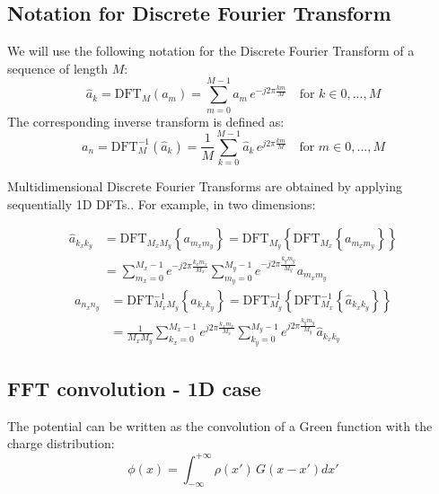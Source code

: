 \subsection{Notation for Discrete Fourier Transform}
We will use the following notation for the Discrete Fourier Transform of a sequence of length $M$:
\begin{equation}
\hat{a}_k = \text{DFT}_M(a_m) =  \sum_{m=0}^{M-1} a_m\, e^{-j2\pi  \frac{km}{M}}  \quad \text{for } k \in 0, ..., M
\end{equation}
The corresponding inverse transform is defined as:
\begin{equation}
{a}_n = \text{DFT}^{-1}_M(\hat{a}_k) =  \frac{1}{M}\sum_{k=0}^{M-1} \hat{a}_k\, e^{j2\pi  \frac{km}{M}}  \quad \text{for } m \in 0, ..., M
\end{equation}

Multidimensional Discrete Fourier Transforms are obtained by applying sequentially 1D DFTs.. For example, in two dimensions:

\begin{equation}
\begin{split}
\hat{a}_{k_xk_y} &= \text{DFT}_{M_xM_y}\left\{a_{m_xm_y}\right\}  
= \text{DFT}_{M_y} \left\{\text{DFT}_{M_x}\left\{a_{m_xm_y}\right\}\right\}\\  
&=\sum_{m_x=0}^{M_x-1} e^{-j 2\pi  \frac{k_x m_x}{M_x}} 
\sum_{m_y=0}^{M_y-1} e^{-j 2\pi  \frac{k_y m_y}{M_y}} a_{m_xm_y}
\end{split}
\end{equation}
\begin{equation}
\begin{split}
{a}_{n_xn_y} &= \text{DFT}^{-1}_{M_xM_y}\left\{a_{k_x k_y}\right\}  
= \text{DFT}^{-1}_{M_y} \left\{\text{DFT}^{-1}_{M_x}\left\{\hat{a}_{k_x k_y}\right\}\right\}\\  
&=\frac{1}{M_x M_y}\sum_{k_x=0}^{M_x-1} e^{j 2\pi  \frac{k_x m_x}{M_x}} 
\sum_{k_y=0}^{M_y-1} e^{j 2\pi  \frac{k_y m_y}{M_y}} \hat{a}_{k_xk_y}
\end{split}
\end{equation}



\subsection{FFT convolution - 1D case}
The potential can be written as the convolution of a Green function with the charge distribution:
\begin{equation}
\phi(x) = \int_{-\infty}^{+\infty} \rho(x')\,G(x-x') dx'
\label{eq:conv}
\end{equation}

